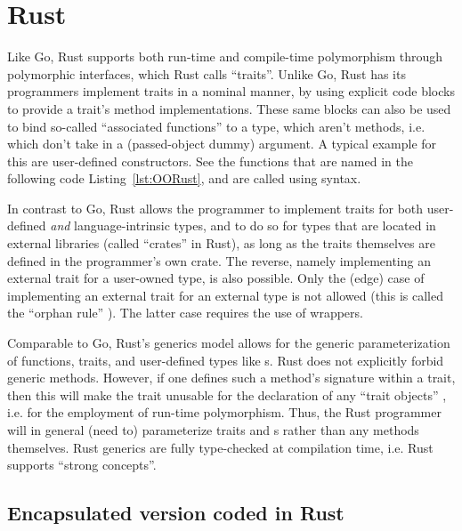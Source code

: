 \documentclass[11pt,oneside]{report}
\newcommand{\code}[1]{{\selectfont\ttfamily{#1}}}
\begin{document}
\section{Rust}

Like Go, Rust supports both run-time and compile-time polymorphism
through polymorphic interfaces, which Rust calls ``traits''. Unlike
Go, Rust has its programmers implement traits in a nominal manner, by
using explicit \code{impl} code blocks to provide a trait's method
implementations. These same \code{impl} blocks can also be used to
bind so-called ``associated functions'' to a type, which aren't
methods, i.e. which don't take in a \code{self} (passed-object dummy)
argument. A typical example for this are user-defined
constructors. See the functions that are named \code{new} in the
following code Listing~\ref{lst:OORust}, and are called using
\code{::} syntax.

In contrast to Go, Rust allows the programmer to implement traits for
both user-defined \emph{and} language-intrinsic types, and to do so
for types that are located in external libraries (called ``crates'' in
Rust), as long as the traits themselves are defined in the
programmer's own crate. The reverse, namely implementing an external
trait for a user-owned type, is also possible. Only the (edge) case of
implementing an external trait for an external type is not allowed
(this is called the ``orphan rule'' \cite{Klabnik_Nichols}). The
latter case requires the use of wrappers.

Comparable to Go, Rust's generics model allows for the generic
parameterization of functions, traits, and user-defined types like
\code{struct}s. Rust does not explicitly forbid generic
methods. However, if one defines such a method's signature within a
trait, then this will make the trait unusable for the declaration of
any ``trait objects'' \cite{Lyon}, i.e. for the employment of run-time
polymorphism. Thus, the Rust programmer will in general (need to)
parameterize traits and \code{struct}s rather than any methods
themselves. Rust generics are fully type-checked at compilation time,
i.e. Rust supports ``strong concepts''.

\subsection{Encapsulated version coded in Rust}
\label{sect:OORust}
\end{document}
